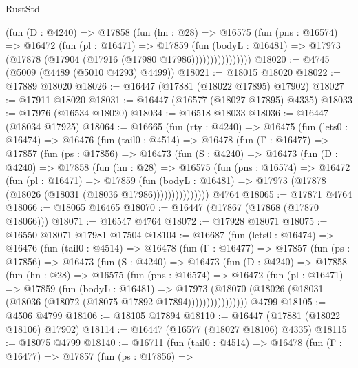 \begin{lexlean}{RustStd}
\begin{coremodule}
                  (fun (D : @4240) =>
                  @17858
                    (fun (hn : @28) =>
                    @16575
                      (fun (pns : @16574) =>
                      @16472
                        (fun (pl : @16471) =>
                        @17859
                          (fun (bodyL : @16481) =>
                          @17973 (@17878 (@17904 (@17916 (@17980 @17986))))))))))))))))
@18020 := @4745 (@5009 (@4489 (@5010 @4293) @4499))
@18021 := @18015 @18020
@18022 := @17889 @18020
@18026 := @16447 (@17881 (@18022 @17895) @17902)
@18027 := @17911 @18020
@18031 := @16447 (@16577 (@18027 @17895) @4335)
@18033 := @17976 (@16534 @18020)
@18034 := @16518 @18033
@18036 := @16447 (@18034 @17925)
@18064 := @16665
    (fun (rty : @4240) =>
    @16475
      (fun (lets0 : @16474) =>
      @16476
        (fun (tail0 : @4514) =>
        @16478
          (fun (Γ : @16477) =>
          @17857
            (fun (ps : @17856) =>
            @16473
              (fun (S : @4240) =>
              @16473
                (fun (D : @4240) =>
                @17858
                  (fun (hn : @28) =>
                  @16575
                    (fun (pns : @16574) =>
                    @16472
                      (fun (pl : @16471) =>
                      @17859
                        (fun (bodyL : @16481) =>
                        @17973 (@17878 (@18026 (@18031 (@18036 @17986)))))))))))))))
    @4764
@18065 := @17871 @4764
@18066 := @18065 @16465
@18070 := @16447 (@17867 (@17868 (@17870 @18066)))
@18071 := @16547 @4764
@18072 := @17928 @18071
@18075 := @16550 @18071 @17981 @17504
@18104 := @16687
    (fun (lets0 : @16474) =>
    @16476
      (fun (tail0 : @4514) =>
      @16478
        (fun (Γ : @16477) =>
        @17857
          (fun (ps : @17856) =>
          @16473
            (fun (S : @4240) =>
            @16473
              (fun (D : @4240) =>
              @17858
                (fun (hn : @28) =>
                @16575
                  (fun (pns : @16574) =>
                  @16472
                    (fun (pl : @16471) =>
                    @17859
                      (fun (bodyL : @16481) =>
                      @17973
                        (@18070
                          (@18026 (@18031 (@18036 (@18072 (@18075 @17892 @17894))))))))))))))))
    @4799
@18105 := @4506 @4799
@18106 := @18105 @17894
@18110 := @16447 (@17881 (@18022 @18106) @17902)
@18114 := @16447 (@16577 (@18027 @18106) @4335)
@18115 := @18075 @4799
@18140 := @16711
    (fun (tail0 : @4514) =>
    @16478
      (fun (Γ : @16477) =>
      @17857
        (fun (ps : @17856) =>

\end{coremodule}
\end{lexlean}
